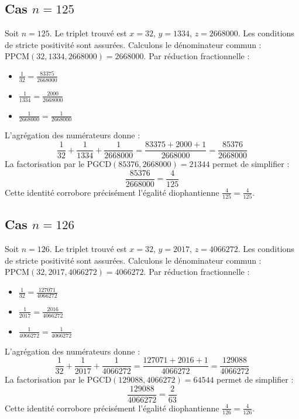 \documentclass[11pt,a4paper]{article}
\begin{document}
\subsection{Cas $n = 125$}
Soit $n = 125$. Le triplet trouvé est $x = 32$, $y = 1334$, $z = 2668000$.
Les conditions de stricte positivité sont assurées.
Calculons le dénominateur commun : $\text{PPCM}(32, 1334, 2668000) = 2668000$.
Par réduction fractionnelle :
\begin{itemize}
    \item $\frac{1}{32} = \frac{83375}{2668000}$
    \item $\frac{1}{1334} = \frac{2000}{2668000}$
    \item $\frac{1}{2668000} = \frac{1}{2668000}$
\end{itemize}
L'agrégation des numérateurs donne :
$$ \frac{1}{32} + \frac{1}{1334} + \frac{1}{2668000} = \frac{83375 + 2000 + 1}{2668000} = \frac{85376}{2668000} $$
La factorisation par le $\text{PGCD}(85376, 2668000) = 21344$ permet de simplifier :
$$ \frac{85376}{2668000} = \frac{4}{125} $$
Cette identité corrobore précisément l'égalité diophantienne $\frac{4}{125} = \frac{4}{125}$.

\subsection{Cas $n = 126$}
Soit $n = 126$. Le triplet trouvé est $x = 32$, $y = 2017$, $z = 4066272$.
Les conditions de stricte positivité sont assurées.
Calculons le dénominateur commun : $\text{PPCM}(32, 2017, 4066272) = 4066272$.
Par réduction fractionnelle :
\begin{itemize}
    \item $\frac{1}{32} = \frac{127071}{4066272}$
    \item $\frac{1}{2017} = \frac{2016}{4066272}$
    \item $\frac{1}{4066272} = \frac{1}{4066272}$
\end{itemize}
L'agrégation des numérateurs donne :
$$ \frac{1}{32} + \frac{1}{2017} + \frac{1}{4066272} = \frac{127071 + 2016 + 1}{4066272} = \frac{129088}{4066272} $$
La factorisation par le $\text{PGCD}(129088, 4066272) = 64544$ permet de simplifier :
$$ \frac{129088}{4066272} = \frac{2}{63} $$
Cette identité corrobore précisément l'égalité diophantienne $\frac{4}{126} = \frac{4}{126}$.
\end{document}
